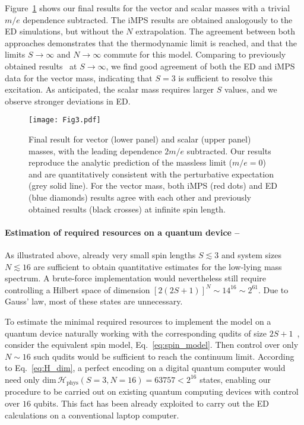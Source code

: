 \documentclass[aps,prl,reprint,twocolumn,superscriptaddress,floatfix,nofootinbib]{revtex4-1}
\begin{document}
	Figure~\ref{fig:masses} shows our final results for the vector and scalar masses with a trivial $m/e$ dependence subtracted. The iMPS results are obtained analogously to the ED simulations, but without the $N$ extrapolation. The agreement between both approaches demonstrates that  the thermodynamic limit is reached, and that the limits $S\rightarrow \infty$ and $N \rightarrow \infty$ commute for this model. Comparing to previously obtained results~\cite{banuls2013mass} at $S\rightarrow \infty$, we find good agreement of both the ED and iMPS data for the vector mass, indicating that $S=3$ is sufficient to resolve this excitation. As anticipated, the scalar mass requires larger $S$ values, and we observe stronger deviations in ED.
	
	\begin{figure}[ht]
		\centering
		\texttt{[image: Fig3.pdf]}
		\caption{Final result for vector (lower panel) and scalar (upper panel) masses, with the leading dependence $2m/e$ subtracted. Our results reproduce the analytic prediction of the massless limit ($m/e=0$) and are quantitatively consistent with the perturbative expectation (grey solid line). For the vector mass, both iMPS (red dots) and ED (blue diamonds) results agree with each other and previously obtained results (black crosses) at infinite spin length.}
		\label{fig:masses}
	\end{figure}
	
	\paragraph{Estimation of required resources on a quantum device --}
	As illustrated above, already very small spin lengths $S \lesssim 3$ and system sizes $N \lesssim 16$ are sufficient to obtain quantitative estimates for the low-lying mass spectrum. A brute-force implementation would nevertheless still require controlling a Hilbert space of dimension $\left[2(2S+1)\right]^N \sim 14^{16} \sim 2^{61}$. Due to Gauss' law, most of these states are unnecessary.
	
	To estimate the minimal required resources to implement the model on a quantum device naturally working with the corresponding qudits of size $2S+1$~\cite{kasper2020universal,Wang2020,Kiktenko_2015,Moro2019,osti_1558470,Wang_2018,Mischuck2012,Kiktenko2020}, consider the equivalent spin model, Eq.~\eqref{eq:spin_model}. Then control over only $N \sim 16$ such qudits would be sufficient to reach the continuum limit. According to Eq.~\eqref{eq:H_dim}, a perfect encoding on a digital quantum computer would need only $\text{dim} \,\mathcal{H}_\text{phys} (S=3, N=16) = 63757 < 2^{16}$ states, enabling our procedure to be carried out on existing quantum computing devices with control over $16$ qubits. This fact has been already exploited to carry out the ED calculations on a conventional laptop computer.
	
\end{document}
